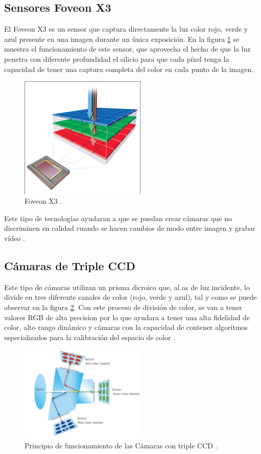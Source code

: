 \documentclass[conference]{IEEEtran}
\begin{document}
\subsection{\textbf{Sensores Foveon X3}}
El Foveon X3 es un sensor que captura directamente la luz color rojo, verde y azul presente en una imagen durante un única exposición. En la figura \ref{x3} se muestra el funcionamiento de este sensor, que aprovecha el hecho de que la luz penetra con diferente profundidad el silicio para que cada píxel tenga la capacidad de tener una captura completa del color en cada punto de la imagen.  

\begin{figure}[H]
\centering
\includegraphics[width=6cm]{x3}
\caption{Foveon X3 \cite{foveon}.}
\label{x3}
\end{figure}

Este tipo de tecnologías ayudaran a que se puedan crear cámaras que no discriminen en calidad cuando se hacen cambios de modo entre imagen y grabar vídeo \cite{foveon}.

\subsection{\textbf{C\'amaras de Triple CCD}}
Este tipo de cámaras utilizan un prisma dicroico que, al as de luz incidente, lo divide en tres diferente canales de color (rojo, verde y azul), tal y como se puede observar en la figura \ref{3ccd}. Con este proceso de división de color, se van a tener valores RGB de alta precision por lo que ayudara a tener una alta fidelidad de color, alto rango dinámico y cámaras con la capacidad de contener algoritmos especializados para la calibración del espacio de color \cite{3ccd}.

\begin{figure}[H]
\centering
\includegraphics[width=6cm]{3ccd}
\caption{Principio de funcionamiento de las Cámaras con triple CCD \cite{3ccd}.}
\label{3ccd}
\end{figure}





%


\end{document}
